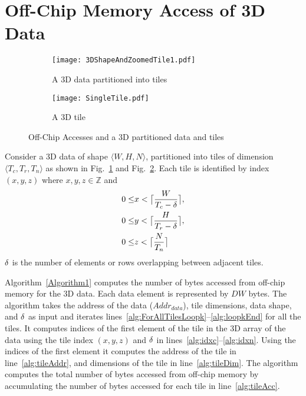 \section{Off-Chip Memory Access of 3D Data}\label{sec:Access3DData}
\begin{figure}[htb]
	\centering
	\captionsetup{font=sf}
	\begin{subfigure}[t]{0.5\columnwidth}
		\centering
		\texttt{[image: 3DShapeAndZoomedTile1.pdf]}
		\caption{A 3D data partitioned into tiles}
		\label{fig:3dTiledData}
	\end{subfigure}
	\begin{subfigure}[t]{0.4\columnwidth}
		\centering
		\texttt{[image: SingleTile.pdf]}
		\caption{A 3D tile}
		\label{fig:3dTile}
	\end{subfigure}
	\caption{Off-Chip Accesses and a 3D partitioned data and tiles}
	\label{fig:3DPartitionedData}
\end{figure}
Consider a 3D data of shape $\langle W,H,N\rangle$, partitioned into tiles of dimension $\langle T_c,T_r,T_n\rangle$ as shown in  Fig.~\ref{fig:3dTiledData} and Fig.~\ref{fig:3dTile}. Each tile is identified by index $(x,y,z)$ where $x, y, z \in \mathbb{Z}$ and 
\begin{align}\label{eq:TileIndexing}
	\begin{aligned}
		0\leq &x<\ceil[\big]{\frac{W}{T_c-\numOverlap}}, \\
		0\leq &y<\ceil[\big]{\frac{H}{T_r-\numOverlap}}, \\
		0\leq &z<\ceil[\big]{\frac{N}{T_n}}
	\end{aligned}
\end{align}
$\numOverlap$ is the number of elements or rows overlapping between adjacent tiles.

Algorithm~\ref{Algorithm1} computes the number of bytes accessed from off-chip memory for the 3D data. Each data element is represented by $DW$ bytes. The algorithm takes the address of the data ($Addr_{data}$), tile dimensions, data shape, and $\numOverlap$ as input and iterates lines~\ref{alg:ForAllTilesLoopk}--\ref{alg:loopkEnd} for all the tiles. It computes indices of the first element of the tile in the 3D array of the data using the tile index $(x,y,z)$ and $\numOverlap$ in lines~\ref{alg:idxc}--\ref{alg:idxn}. Using the indices of the first element it computes the address of the tile in line~\ref{alg:tileAddr}, and dimensions of the tile in line~\ref{alg:tileDim}. The algorithm computes the total number of bytes accessed from off-chip memory by accumulating the number of bytes accessed for each tile in line~\ref{alg:tileAcc}. 

